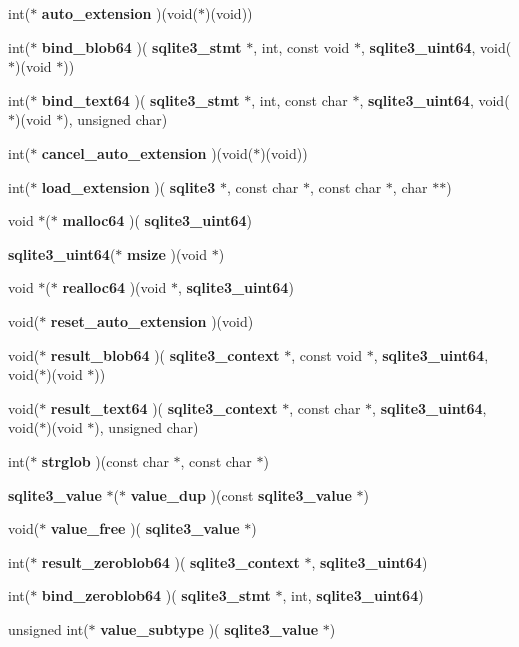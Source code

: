 \begin{DoxyCompactItemize}
\item 
int($\ast$ \textbf{ auto\+\_\+extension} )(void($\ast$)(void))
\item 
int($\ast$ \textbf{ bind\+\_\+blob64} )(\textbf{ sqlite3\+\_\+stmt} $\ast$, int, const void $\ast$, \textbf{ sqlite3\+\_\+uint64}, void($\ast$)(void $\ast$))
\item 
int($\ast$ \textbf{ bind\+\_\+text64} )(\textbf{ sqlite3\+\_\+stmt} $\ast$, int, const char $\ast$, \textbf{ sqlite3\+\_\+uint64}, void($\ast$)(void $\ast$), unsigned char)
\item 
int($\ast$ \textbf{ cancel\+\_\+auto\+\_\+extension} )(void($\ast$)(void))
\item 
int($\ast$ \textbf{ load\+\_\+extension} )(\textbf{ sqlite3} $\ast$, const char $\ast$, const char $\ast$, char $\ast$$\ast$)
\item 
void $\ast$($\ast$ \textbf{ malloc64} )(\textbf{ sqlite3\+\_\+uint64})
\item 
\textbf{ sqlite3\+\_\+uint64}($\ast$ \textbf{ msize} )(void $\ast$)
\item 
void $\ast$($\ast$ \textbf{ realloc64} )(void $\ast$, \textbf{ sqlite3\+\_\+uint64})
\item 
void($\ast$ \textbf{ reset\+\_\+auto\+\_\+extension} )(void)
\item 
void($\ast$ \textbf{ result\+\_\+blob64} )(\textbf{ sqlite3\+\_\+context} $\ast$, const void $\ast$, \textbf{ sqlite3\+\_\+uint64}, void($\ast$)(void $\ast$))
\item 
void($\ast$ \textbf{ result\+\_\+text64} )(\textbf{ sqlite3\+\_\+context} $\ast$, const char $\ast$, \textbf{ sqlite3\+\_\+uint64}, void($\ast$)(void $\ast$), unsigned char)
\item 
int($\ast$ \textbf{ strglob} )(const char $\ast$, const char $\ast$)
\item 
\textbf{ sqlite3\+\_\+value} $\ast$($\ast$ \textbf{ value\+\_\+dup} )(const \textbf{ sqlite3\+\_\+value} $\ast$)
\item 
void($\ast$ \textbf{ value\+\_\+free} )(\textbf{ sqlite3\+\_\+value} $\ast$)
\item 
int($\ast$ \textbf{ result\+\_\+zeroblob64} )(\textbf{ sqlite3\+\_\+context} $\ast$, \textbf{ sqlite3\+\_\+uint64})
\item 
int($\ast$ \textbf{ bind\+\_\+zeroblob64} )(\textbf{ sqlite3\+\_\+stmt} $\ast$, int, \textbf{ sqlite3\+\_\+uint64})
\item 
unsigned int($\ast$ \textbf{ value\+\_\+subtype} )(\textbf{ sqlite3\+\_\+value} $\ast$)
\item 
$$
\end{DoxyCompactItemize}
